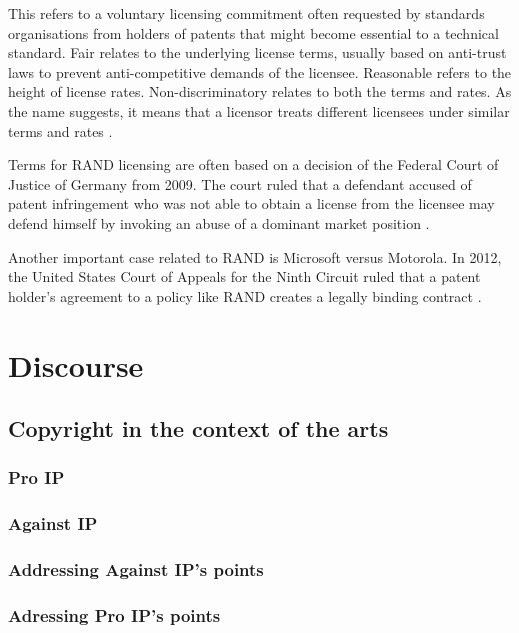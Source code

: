 \documentclass[a4paper]{report}
\begin{document}
This refers to a voluntary licensing commitment often requested by standards organisations from holders of patents that might become essential to a technical standard. Fair relates to the underlying license terms, usually based on anti-trust laws to prevent anti-competitive demands of the licensee. Reasonable refers to the height of license rates. Non-discriminatory relates to both the terms and rates. As the name suggests, it means that a licensor treats different licensees under similar terms and rates \parencite{WikiRAND}. 

Terms for RAND licensing are often based on a decision of the Federal Court of Justice of Germany from 2009. The court ruled that a defendant accused of patent infringement who was not able to obtain a license from the licensee may defend himself by invoking an abuse of a dominant market position \parencite{OrangeBook}.
 
Another important case related to RAND is Microsoft versus Motorola. In 2012, the United States Court of Appeals for the Ninth Circuit ruled that a patent holder's agreement to a policy like RAND creates a legally binding contract \parencite{MicrosoftVsMotorola}.

\chapter{Discourse}
\label{ch:Disc}

\section{Copyright in the context of the arts}
\label{sec:CopyArts}

\subsection{Pro IP}

\subsection{Against IP}

\subsection{Addressing Against IP's points}

\subsection{Adressing Pro IP's points}
\end{document}
